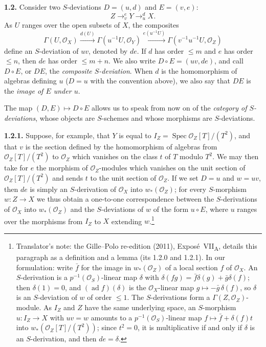 \medskip
\noindent\textbf{1.2.}
\label{sga3:VIIA:1.2}
Consider two \(S\)-deviations \(D=(u,d)\) and \(E=(v,e)\):
\[
  Z\mathop{\longrightarrow}^{e}_{v}Y
  \mathop{\longrightarrow}^{d}_{u}X.
\]
As \(U\) ranges over the open subsets of \(X\), the composites
\[
 \Gamma(U,\mathcal O_X)
 \xrightarrow{d(U)}
 \Gamma(u^{-1}U,\mathcal O_Y)
 \xrightarrow{e(u^{-1}U)}
 \Gamma(v^{-1}u^{-1}U,\mathcal O_Z)
\]
define an \(S\)-deviation of \(uv\), denoted by \(de\). If \(d\) has
order \(\leq m\) and \(e\) has order \(\leq n\), then \(de\) has order
\(\leq m+n\). We also write \(D\circ E=(uv,de)\), and call
\(D\circ E\), or \(DE\), the \emph{composite \(S\)-deviation}. When
\(d\) is the homomorphism of algebras defining \(u\) (\(D=u\) with the
convention above), we also say that \(DE\) is the \emph{image of \(E\)
under \(u\)}.

The map \((D,E)\mapsto D\circ E\) allows us to speak from now on of the
\emph{category of \(S\)-deviations}, whose objects are \(S\)-schemes
and whose morphisms are \(S\)-deviations.

\medskip
\noindent\textbf{1.2.1.}
\label{sga3:VIIA:1.2.1}
Suppose, for example, that \(Y\) is equal to
\(I_Z=\operatorname{Spec}\mathcal O_Z[T]/(T^2)\), and that \(v\) is the
section defined by the homomorphism of algebras from
\(\mathcal O_Z[T]/(T^2)\) to \(\mathcal O_Z\) which vanishes on the class
\(t\) of \(T\) modulo \(T^2\). We may then take for \(e\) the morphism of
\(\mathcal O_Z\)-modules which vanishes on the unit section of
\(\mathcal O_Z[T]/(T^2)\) and sends \(t\) to the unit section of
\(\mathcal O_Z\). If we set \(D=u\) and \(w=uv\), then \(de\) is simply
an \(S\)-derivation of \(\mathcal O_X\) into \(w_*(\mathcal O_Z)\); for
every \(S\)-morphism \(w:Z\to X\) we thus obtain a one-to-one
correspondence between the \(S\)-derivations of \(\mathcal O_X\) into
\(w_*(\mathcal O_Z)\) and the \(S\)-deviations of \(w\) of the form
\(u\circ E\), where \(u\) ranges over the morphisms from \(I_Z\) to
\(X\) extending \(w\).\footnote{Translator's note: the Gille--Polo
re-edition (2011), Expos\'e~VII\textsubscript{A}, details this
paragraph as a definition and a lemma (its 1.2.0 and 1.2.1). In our
formulation: write \(\bar f\) for the image in \(w_*(\mathcal O_Z)\) of a
local section \(f\) of \(\mathcal O_X\). An \(S\)-derivation is a
\(p^{-1}(\mathcal O_S)\)-linear map \(\delta\) with
\(\delta(fg)=\bar f\delta(g)+\bar g\delta(f)\); then \(\delta(1)=0\),
and \((\operatorname{ad}f)(\delta)\) is the \(\mathcal O_X\)-linear map
\(g\mapsto-\bar g\,\delta(f)\), so \(\delta\) is an \(S\)-deviation of
\(w\) of order \(\leq1\). The \(S\)-derivations form a
\(\Gamma(Z,\mathcal O_Z)\)-module. As \(I_Z\) and \(Z\) have the same
underlying space, an \(S\)-morphism \(u:I_Z\to X\) with \(uv=w\) amounts
to a \(p^{-1}(\mathcal O_S)\)-linear map
\(f\mapsto\bar f+\delta(f)t\) into \(w_*(\mathcal O_Z[T]/(T^2))\); since
\(t^2=0\), it is multiplicative if and only if \(\delta\) is an
\(S\)-derivation, and then \(de=\delta\).}

